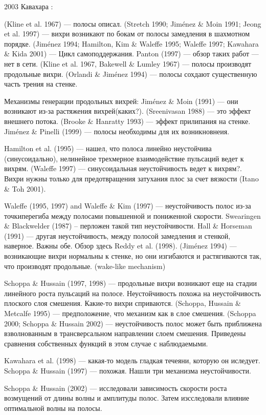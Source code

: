 2003 Кавахара \cite{kawahara2003linear}: 

(Kline et al. 1967) --- полосы описал. (Stretch 1990; Jiménez \& Moin 1991; Jeong et al. 1997) --- вихри возникают по бокам от полосы замедления в шахмотном порядке. (Jiménez 1994; Hamilton, Kim \& Waleffe 1995; Waleffe 1997; Kawahara \& Kida 2001) --- Цикл самоподдержания. Panton (1997) --- обзор таких работ --- нет в сети. (Kline et al. 1967, Bakewell \& Lumley 1967) --- полосы производят продольные вихри. (Orlandi \& Jiménez 1994) --- полосы сохдают существенную часть трения на стенке. 

Механизмы генерации продольных вихрей: Jiménez \& Moin (1991) --- они возникают из-за растяжения вихрей(каких?). (Sreenivasan 1988) --- это эффект внешнего потока. (Brooke \& Hanratty 1993) --- эффект прилипания на стенке. Jiménez \& Pinelli (1999) --- полосы необходимы для их возникновнеия. 

Hamilton et al. (1995) --- нашел, что полоса линейно неустойчива (синусоидально), нелинейное трехмерное взаимодействие пульсаций ведет к вихрям. (Waleffe 1997) --- синусоидальная неустойчивость ведет к вихрям?. Вихри нужны только для предотвращения затухания плос за счет вязкости (Itano \& Toh 2001). 

Waleffe (1995, 1997) and Waleffe \& Kim (1997) --- неустойчивость полос из-за точкиперегиба между полосами повышенной и пониженной скорости. Swearingen \& Blackwelder (1987) -- перложен такой тип неустойчивости. Hall \& Horseman (1991) --- другая неустойчивость, между полосой замедления и стенкой, наверное. Важны обе. Обзор здесь Reddy et al. (1998). (Jiménez 1994) --- возникающие вихри нормальны к стенке, но они изгибаются и растягиваются так, что производят продольные. (wake-like mechanism)

Schoppa \& Hussain (1997, 1998) --- продольные вихри возникают еще на стадии линейного роста пульсаций на полосе. Неустойчивость похожа на неустойчивость плоского слоя смешения. Какие-то вихри сприваются. (Schoppa, Hussain \& Metcalfe 1995) --- предположение, что механизм как в слое смешения. (Schoppa 2000; Schoppa \& Hussain 2002) --- неустойчивость полос может быть приближена взволнованным в трансверсальном направлении слоем смешения. Приведены сравнения собственных функций в этом случае с наблюдаемыми. 

Kawahara et al. (1998) --- какая-то модель гладкая течеяни, которую он иследует. Schoppa \& Hussain (1997) --- похожая. Нашли три механизма неустойчивости. 

Schoppa \& Hussain (2002) --- исследовали зависимость скорости роста возмущений от длины волны и амплитуды полос. Затем изсследовали влияние оптимальной волны на полосы. 

